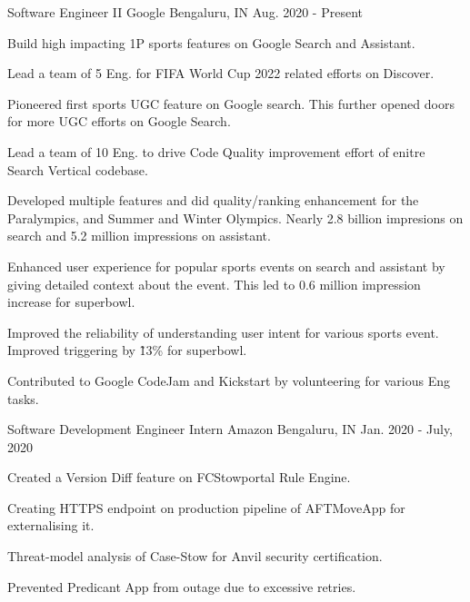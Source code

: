 


\begin{cventries}


\cventry
{Software Engineer II} %
{Google} %
{Bengaluru, IN} %
{Aug. 2020 - Present} %
{ %
\begin{cvitems}
\item {Build high impacting 1P sports features on Google Search and Assistant.}
\item {Lead a team of 5 Eng. for FIFA World Cup 2022 related efforts on Discover.}
\item {Pioneered first sports UGC feature on Google search. This further opened doors for more UGC efforts on Google Search.}
\item {Lead a team of 10 Eng. to drive Code Quality improvement effort of enitre Search Vertical codebase.}
\item {Developed multiple features and did quality/ranking enhancement for the Paralympics, and Summer and Winter Olympics. Nearly 2.8 billion impresions on search and 5.2 million impressions on assistant.}
\item {Enhanced user experience for popular sports events on search and assistant by giving detailed context about the event. This led to 0.6 million impression increase for superbowl.}
\item {Improved the reliability of understanding user intent for various sports event. Improved triggering by \~13\% for superbowl.}
\item {Contributed to Google CodeJam and Kickstart by volunteering for various Eng tasks.}
\end{cvitems}
}


\cventry
{Software Development Engineer Intern} %
{Amazon} %
{Bengaluru, IN} %
{Jan. 2020 - July, 2020} %
{ %
\begin{cvitems}
\item {Created a Version Diff feature on FCStowportal Rule Engine.}
\item {Creating HTTPS endpoint on production pipeline of AFTMoveApp for externalising it.}
\item {Threat-model analysis of Case-Stow for Anvil security certification.}
\item {Prevented Predicant App from outage due to excessive retries.}
\end{cvitems}
}


\end{cventries}
